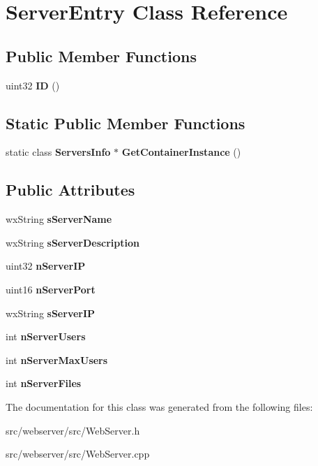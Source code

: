 \section{ServerEntry Class Reference}
\label{classServerEntry}
\subsection*{Public Member Functions}
\begin{DoxyCompactItemize}
\item 
uint32 {\bfseries ID} ()\label{classServerEntry_a577e4f4e0d2d36baf4c9a34d699bdb0e}

\end{DoxyCompactItemize}
\subsection*{Static Public Member Functions}
\begin{DoxyCompactItemize}
\item 
static class {\bf ServersInfo} $\ast$ {\bfseries GetContainerInstance} ()\label{classServerEntry_a896681e67ca2d528a8f99ae8a2c4882b}

\end{DoxyCompactItemize}
\subsection*{Public Attributes}
\begin{DoxyCompactItemize}
\item 
wxString {\bfseries sServerName}\label{classServerEntry_ae236a1acdc314f597067538717f2fb73}

\item 
wxString {\bfseries sServerDescription}\label{classServerEntry_a2cd6a4b268a812c0689aa81e55ba5f3e}

\item 
uint32 {\bfseries nServerIP}\label{classServerEntry_a57da76e972a47734a0099a22bdd76efc}

\item 
uint16 {\bfseries nServerPort}\label{classServerEntry_ab6004c290dca5c9c7542a3b1bd45a0f2}

\item 
wxString {\bfseries sServerIP}\label{classServerEntry_a53adb43e653ebdd5aa9df9355f857186}

\item 
int {\bfseries nServerUsers}\label{classServerEntry_ac100755b366e590b721ce5d83498fe6b}

\item 
int {\bfseries nServerMaxUsers}\label{classServerEntry_afc8decae847b0da1b3a6f9d6035df13c}

\item 
int {\bfseries nServerFiles}\label{classServerEntry_a5a97d8beb65aeec9c3d69a4f468b91cd}

\end{DoxyCompactItemize}


The documentation for this class was generated from the following files:\begin{DoxyCompactItemize}
\item 
src/webserver/src/WebServer.h\item 
src/webserver/src/WebServer.cpp\end{DoxyCompactItemize}

